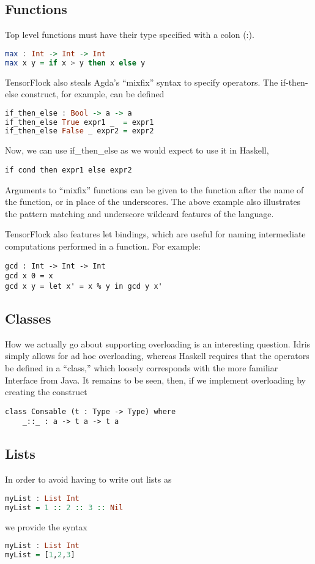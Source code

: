 \documentclass[12pt]{article}
\begin{document}
\subsection{Functions}
Top level functions must have their type specified with a colon (:).
\begin{lstlisting}[language=Haskell]
max : Int -> Int -> Int
max x y = if x > y then x else y
\end{lstlisting}
TensorFlock also steals Agda's ``mixfix'' syntax to specify operators. The if-then-else construct, for example, can be defined
\begin{lstlisting}[language=Haskell]
if_then_else : Bool -> a -> a
if_then_else True expr1 _  = expr1
if_then_else False _ expr2 = expr2
\end{lstlisting}
Now, we can use if\_then\_else as we would expect to use it in Haskell, 
\begin{lstlisting}
if cond then expr1 else expr2
\end{lstlisting}
Arguments to ``mixfix'' functions can be given to the function after the name of the function, or in place of the underscores. The above example also illustrates the pattern matching and underscore wildcard features of the language. 

TensorFlock also features let bindings, which are useful for naming intermediate computations performed in a function. For example:
\begin{lstlisting}
gcd : Int -> Int -> Int
gcd x 0 = x
gcd x y = let x' = x % y in gcd y x'
\end{lstlisting}
\subsection{Classes}
How we actually go about supporting overloading is an interesting question. Idris simply allows for ad hoc overloading, whereas Haskell requires that the operators be defined in a ``class,'' which loosely corresponds with the more familiar Interface from Java. It remains to be seen, then, if we implement overloading by creating the construct 
\begin{lstlisting}
class Consable (t : Type -> Type) where
	_::_ : a -> t a -> t a
\end{lstlisting}
\subsection{Lists}
In order to avoid having to write out lists as 
\begin{lstlisting}[language=Haskell]
myList : List Int
myList = 1 :: 2 :: 3 :: Nil
\end{lstlisting}
we provide the syntax 
\begin{lstlisting}[language=Haskell]
myList : List Int
myList = [1,2,3]
\end{lstlisting}
\end{document}
